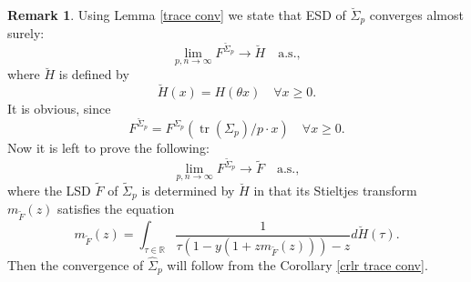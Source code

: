 \documentclass[a4paper,11pt]{book}
\theoremstyle{plain}
\theoremstyle{definition}
\newtheorem{rmrk}[thm]{Remark}
\newcommand{\MR}{\mathbb{R}}
\newcommand{\tr}{\operatorname{tr}}
\begin{document}
    \begin{rmrk} \label{Thm 2 expl}
    	Using Lemma \ref{trace conv} we state that ESD of $\breve{\Sigma}_p$ converges almost surely:
    	\[\lim_{p,n \rightarrow \infty} F^{\breve{\Sigma}_p} \rightarrow \breve{H} \quad \text{a.s.},\] 
    	where $\breve{H}$ is defined by
    	\[\breve{H}(x) = H(\theta x) \quad \forall x \geq 0. \]
    	It is obvious, since
    	\[ F^{\breve{\Sigma}_p} = F^{\Sigma_p}(\tr(\Sigma_p)/p \cdot x) \quad \forall x \geq 0. \]
    	Now it is left to prove the following:
    	\[\lim_{p,n \rightarrow \infty}   F^{\widetilde{\Sigma}_p} \rightarrow \widetilde{F} \quad \text{a.s.}, \]
    	where the LSD $\widetilde{F}$ of $\widetilde{\Sigma}_p$ is determined by $\breve{H}$ in that its Stieltjes transform $m_{\widetilde{F}}(z)$ satisfies the equation
    	\[ m_{\widetilde{F}}(z) = \int_{\tau \in \MR} \frac{1}{ \tau(1- y(1 + zm_{\widetilde{F}}(z))) - z } d\breve{H}(\tau). \]
    	Then the convergence of $\widehat{\Sigma}_p$ will follow from the Corollary \ref{crlr trace conv}.
    \end{rmrk}
    
\end{document}
